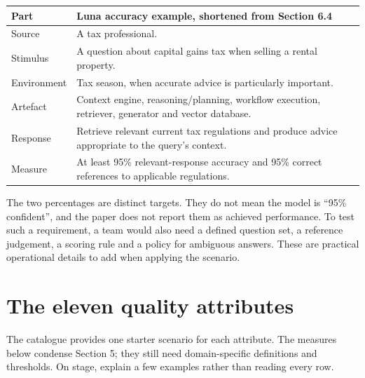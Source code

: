 \documentclass[11pt,a4paper]{article}
\begin{document}
\begin{tabularx}{\textwidth}{@{}p{}Y@{}}
\toprule
\textbf{Part} & \textbf{Luna accuracy example, shortened from Section 6.4}\\
\midrule
Source & A tax professional.\\
Stimulus & A question about capital gains tax when selling a rental property.\\
Environment & Tax season, when accurate advice is particularly important.\\
Artefact & Context engine, reasoning/planning, workflow execution, retriever, generator and vector database.\\
Response & Retrieve relevant current tax regulations and produce advice appropriate to the query's context.\\
Measure & At least 95\% relevant-response accuracy and 95\% correct references to applicable regulations.\\
\bottomrule
\end{tabularx}

The two percentages are distinct targets. They do not mean the model is ``95\% confident'', and the paper does not report them as achieved performance. To test such a requirement, a team would also need a defined question set, a reference judgement, a scoring rule and a policy for ambiguous answers. These are practical operational details to add when applying the scenario.

\section{The eleven quality attributes}
The catalogue provides one starter scenario for each attribute. The measures below condense Section 5; they still need domain-specific definitions and thresholds. On stage, explain a few examples rather than reading every row.
\end{document}

